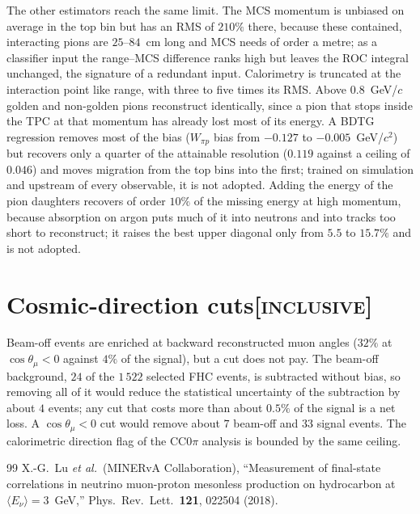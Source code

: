 \documentclass[11pt,a4paper]{article}
\newcommand{\scopetag}[1]{\hfill{\normalfont\small\textsc{[#1]}}}
\begin{document}
The other estimators reach the same limit. The MCS momentum is unbiased on average in the top bin but has
an RMS of $210\%$ there, because these contained, interacting pions are $25$--$84$~cm long and MCS needs of
order a metre; as a classifier input the range--MCS difference ranks high but leaves the ROC integral
unchanged, the signature of a redundant input. Calorimetry is truncated at the interaction point like range,
with three to five times its RMS. Above $0.8$~GeV/$c$ golden and non-golden pions reconstruct identically,
since a pion that stops inside the TPC at that momentum has already lost most of its energy. A BDTG
regression removes most of the bias ($W_{\pi p}$ bias from $-0.127$ to $-0.005$~GeV/$c^2$) but recovers only
a quarter of the attainable resolution ($0.119$ against a ceiling of $0.046$) and moves migration from the
top bins into the first; trained on simulation and upstream of every observable, it is not adopted. Adding
the energy of the pion daughters recovers of order $10\%$ of the missing energy at high momentum, because
absorption on argon puts much of it into neutrons and into tracks too short to reconstruct; it raises the
best upper diagonal only from $5.5$ to $15.7\%$ and is not adopted.

\section[Cosmic-direction cuts]{Cosmic-direction cuts\scopetag{inclusive}}
\label{sec:supp_cosmiccut}

Beam-off events are enriched at backward reconstructed muon angles ($32\%$ at $\cos\theta_\mu<0$ against
$4\%$ of the signal), but a cut does not pay. The beam-off background, $24$ of the $1\,522$ selected FHC
events, is subtracted without bias, so removing all of it would reduce the statistical uncertainty of the
subtraction by about $4$ events; any cut that costs more than about $0.5\%$ of the signal is a net loss. A
$\cos\theta_\mu<0$ cut would remove about $7$ beam-off and $33$ signal events. The calorimetric direction flag
of the CC$0\pi$ analysis is bounded by the same ceiling.

%

\begin{thebibliography}{99}
  X.-G.~Lu \textit{et al.}\ (MINERvA Collaboration),
  ``Measurement of final-state correlations in neutrino muon-proton mesonless
  production on hydrocarbon at $\langle E_\nu\rangle=3$~GeV,''
  Phys.\ Rev.\ Lett.\ \textbf{121}, 022504 (2018).

\end{thebibliography}
\end{document}
